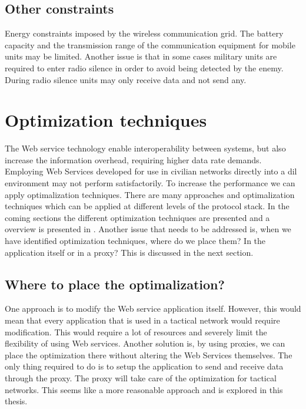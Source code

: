\documentclass[USenglish]{ifimaster}
\begin{document}
\subsection{Other constraints}
Energy constraints imposed by the wireless communication grid. The battery
capacity and the transmission range of the communication equipment for mobile
units may be limited. Another issue is that in some cases military units are
required to enter radio silence in order to avoid being detected by the enemy.
During radio silence units may only receive data and not send any.

\section{Optimization techniques}
The Web service technology enable interoperability between systems, but also
increase the information overhead, requiring higher data rate demands. Employing
Web Services developed for use in civilian networks directly into a \gls{dil}
environment may not perform satisfactorily. To increase the performance we can
apply optimalization techniques. There are many approaches and optimalization
techniques which can be applied at different levels of the protocol stack. In
the coming sections the different optimization techniques are presented and a
overview is presented in . Another issue
that needs to be addressed is, when we have identified optimization techniques,
where do we place them? In the application itself or in a proxy? This is
discussed in the next section.

\subsection{Where to place the optimalization?}
One approach is to modify the Web service application itself. However, this
would mean that every application that is used in a tactical network would
require modification. This would require a lot of resources and severely limit
the flexibility of using Web services. Another solution is, by using proxies, we
can place the optimization there without altering the Web Services themselves.
The only thing required to do is to setup the application to send and receive
data through the proxy. The proxy will take care of the optimization for
tactical networks. This seems like a more reasonable approach and is explored in
this thesis.
\end{document}
